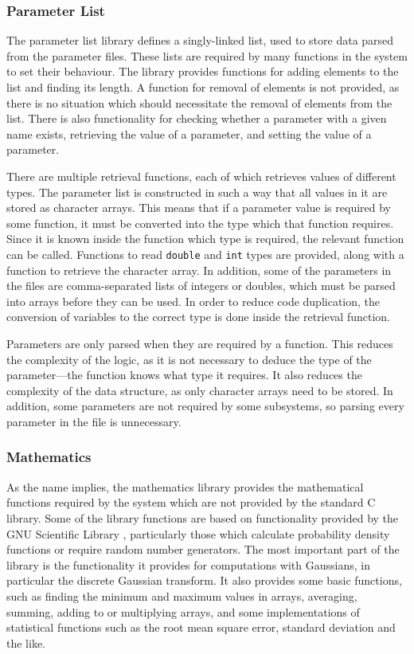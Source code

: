 \documentclass[a4paper,11pt]{article}
\begin{document}
\subsubsection{Parameter List}
\label{sec-6-3-1}

    The parameter list library defines a singly-linked list, used to store data
    parsed from the parameter files. These lists are required by many functions
    in the system to set their behaviour. The library provides functions for
    adding elements to the list and finding its length. A function for removal
    of elements is not provided, as there is no situation which should
    necessitate the removal of elements from the list. There is also
    functionality for checking whether a parameter with a given name exists,
    retrieving the value of a parameter, and setting the value of a parameter.

    There are multiple retrieval functions, each of which retrieves values of
    different types. The parameter list is constructed in such a way that all
    values in it are stored as character arrays. This means that if a parameter
    value is required by some function, it must be converted into the type which
    that function requires. Since it is known inside the function which type is
    required, the relevant function can be called. Functions to read
    \texttt{double} and \texttt{int} types are provided, along with a function
    to retrieve the character array. In addition, some of the parameters in the
    files are comma-separated lists of integers or doubles, which must be parsed
    into arrays before they can be used. In order to reduce code duplication,
    the conversion of variables to the correct type is done inside the retrieval
    function.

    Parameters are only parsed when they are required by a function. This
    reduces the complexity of the logic, as it is not necessary to deduce the
    type of the parameter---the function knows what type it requires. It also
    reduces the complexity of the data structure, as only character arrays need
    to be stored. In addition, some parameters are not required by some
    subsystems, so parsing every parameter in the file is unnecessary.
\subsubsection{Mathematics}
\label{sec-6-3-2}

    As the name implies, the mathematics library provides the mathematical
    functions required by the system which are not provided by the standard C
    library. Some of the library functions are based on functionality provided
    by the GNU Scientific Library \cite{gsl}, particularly those which calculate
    probability density functions or require random number generators. The most
    important part of the library is the functionality it provides for
    computations with Gaussians, in particular the discrete Gaussian
    transform. It also provides some basic functions, such as finding the
    minimum and maximum values in arrays, averaging, summing, adding to or
    multiplying arrays, and some implementations of statistical functions such
    as the root mean square error, standard deviation and the like.
\end{document}
